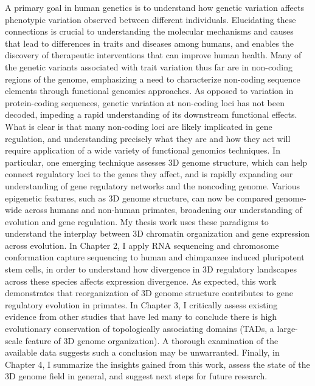 \abstract
A primary goal in human genetics is to understand how genetic variation affects phenotypic variation observed between different individuals.  Elucidating these connections is crucial to understanding the molecular mechanisms and causes that lead to differences in traits and diseases among humans, and enables the discovery of therapeutic interventions that can improve human health. Many of the genetic variants associated with trait variation thus far are in non-coding regions of the genome, emphasizing a need to characterize non-coding sequence elements through functional genomics approaches. As opposed to variation in protein-coding sequences, genetic variation at non-coding loci has not been decoded, impeding a rapid understanding of its downstream functional effects. What is clear is that many non-coding loci are likely implicated in gene regulation, and understanding precisely what they are and how they act will require application of a wide variety of functional genomics techniques. In particular, one emerging technique assesses 3D genome structure, which can help connect regulatory loci to the genes they affect, and is rapidly expanding our understanding of gene regulatory networks and the noncoding genome. Various epigenetic features, such as 3D genome structure, can now be compared genome-wide across humans and non-human primates, broadening our understanding of evolution and gene regulation. My thesis work uses these paradigms to understand the interplay between 3D chromatin organization and gene expression across evolution. In Chapter 2, I apply RNA sequencing and chromosome conformation capture sequencing to human and chimpanzee induced pluripotent stem cells, in order to understand how divergence in 3D regulatory landscapes across these species affects expression divergence. As expected, this work demonstrates that reorganization of 3D genome structure contributes to gene regulatory evolution in primates. In Chapter 3, I critically assess existing evidence from other studies that have led many to conclude there is high evolutionary conservation of topologically associating domains (TADs, a large-scale feature of 3D genome organization). A thorough examination of the available data suggests such a conclusion may be unwarranted. Finally, in Chapter 4, I summarize the insights gained from this work, assess the state of the 3D genome field in general, and suggest next steps for future research.